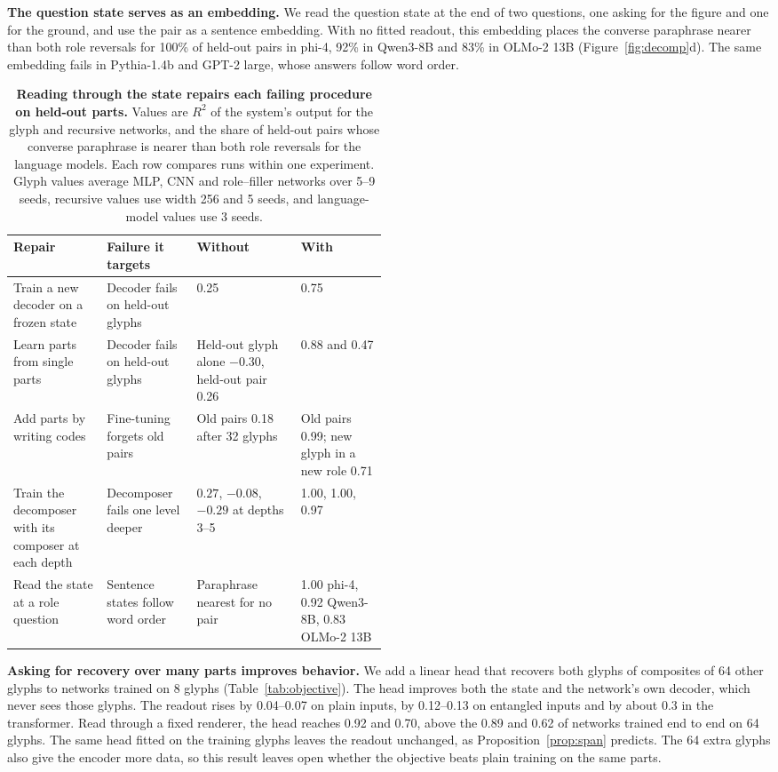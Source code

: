 \textbf{The question state serves as an embedding.} We read the question state at the end of two questions, one asking for the figure and one for the ground, and use the pair as a sentence embedding. With no fitted readout, this embedding places the converse paraphrase nearer than both role reversals for 100\% of held-out pairs in phi-4, 92\% in Qwen3-8B and 83\% in OLMo-2 13B (Figure~\ref{fig:decomp}d). The same embedding fails in Pythia-1.4b and GPT-2 large, whose answers follow word order.

\begin{table}[t]
  \caption{\textbf{Reading through the state repairs each failing procedure on held-out parts.} Values are $R^2$ of the system's output for the glyph and recursive networks, and the share of held-out pairs whose converse paraphrase is nearer than both role reversals for the language models. Each row compares runs within one experiment. Glyph values average MLP, CNN and role--filler networks over 5--9 seeds, recursive values use width 256 and 5 seeds, and language-model values use 3 seeds.}
  \label{tab:remedies}
  \centering\small
  \begin{tabularx}{\linewidth}{@{}P{0.25\linewidth}P{0.24\linewidth}YY@{}}
    \toprule
    Repair & Failure it targets & Without & With \\
    \midrule
    Train a new decoder on a frozen state & Decoder fails on held-out glyphs & 0.25 & 0.75 \\
    Learn parts from single parts & Decoder fails on held-out glyphs & Held-out glyph alone $-0.30$, held-out pair 0.26 & 0.88 and 0.47 \\
    Add parts by writing codes & Fine-tuning forgets old pairs & Old pairs 0.18 after 32 glyphs & Old pairs 0.99; new glyph in a new role 0.71 \\
    Train the decomposer with its composer at each depth & Decomposer fails one level deeper & $0.27$, $-0.08$, $-0.29$ at depths 3--5 & 1.00, 1.00, 0.97 \\
    Read the state at a role question & Sentence states follow word order & Paraphrase nearest for no pair & 1.00 phi-4, 0.92 Qwen3-8B, 0.83 OLMo-2 13B \\
    \bottomrule
  \end{tabularx}
\end{table}

\textbf{Asking for recovery over many parts improves behavior.} We add a linear head that recovers both glyphs of composites of 64 other glyphs to networks trained on 8 glyphs (Table~\ref{tab:objective}). The head improves both the state and the network's own decoder, which never sees those glyphs. The readout rises by 0.04--0.07 on plain inputs, by 0.12--0.13 on entangled inputs and by about 0.3 in the transformer. Read through a fixed renderer, the head reaches 0.92 and 0.70, above the 0.89 and 0.62 of networks trained end to end on 64 glyphs. The same head fitted on the training glyphs leaves the readout unchanged, as Proposition~\ref{prop:span} predicts. The 64 extra glyphs also give the encoder more data, so this result leaves open whether the objective beats plain training on the same parts.

